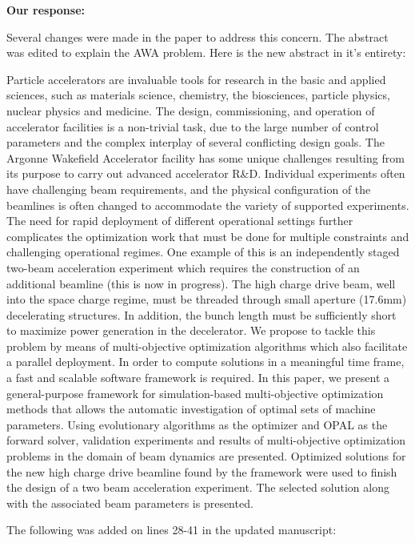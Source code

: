 \documentclass{article}
\begin{document}
{\bf Our response:} {\color{blue} 
	Several changes were made in the paper to address this concern. 
	The abstract was edited to explain the AWA problem. 
	Here is the new abstract in it's entirety: 
	
	Particle accelerators are invaluable tools for research in the basic and applied sciences, such as materials science, chemistry,
	the biosciences, particle physics, nuclear physics and medicine. The design, commissioning, and operation of accelerator facilities is a
	non-trivial task, due to the large number of control parameters and the complex interplay of several conflicting design goals.
	The Argonne Wakefield Accelerator facility has some unique challenges resulting from its purpose to carry out advanced accelerator R\&D.
	Individual experiments often have challenging beam requirements, and the physical configuration of the beamlines is often changed
	to accommodate the variety of supported experiments. The need for rapid deployment of different operational settings
	further complicates the optimization work that must be done for multiple constraints and challenging operational regimes. 
	One example of this is an independently staged two-beam acceleration experiment which requires the construction 
	of an additional beamline (this is now in progress).  The high charge drive beam, well into the space charge regime, must be threaded
	through small aperture (17.6mm) decelerating structures.  
	In addition, the bunch length must be sufficiently short to maximize power generation in the decelerator.  
	We propose to tackle this problem by means of multi-objective optimization algorithms which also facilitate a parallel deployment.
	In order to compute solutions in a meaningful time frame, a fast and scalable software framework is required.
	In this paper, we present a general-purpose framework for simulation-based
	multi-objective optimization methods that allows the automatic investigation of optimal sets of machine parameters.
	Using evolutionary algorithms as the optimizer and \textsc{OPAL} as the forward solver, validation experiments and 
	results of multi-objective optimization problems in the domain of beam dynamics are presented. 
	Optimized solutions for the new high charge drive beamline found by the framework were used to finish the design 
	of a two beam acceleration experiment.
	The selected solution along with the associated beam parameters is presented.
	
	
	
	The following was added on lines 28-41 in the updated manuscript:

}
\end{document}
